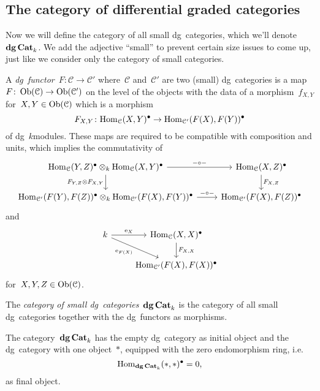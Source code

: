 \begin{refsection}
\section{The category of differential graded categories}
Now we will define the category of all small dg~categories, which we'll denote~$\mathbf{dg\,Cat}_k$. We add the adjective ``small'' to prevent certain size issues to come up, just like we consider only the category of small categories.
\begin{definition}
  A \emph{dg~functor}~$F\colon\mathcal{C}\to\mathcal{C}'$ where~$\mathcal{C}$ and~$\mathcal{C}'$ are two (small) dg~categories is a map~$F\colon\operatorname{Ob}(\mathcal{C})\to\operatorname{Ob}(\mathcal{C}')$ on the level of the objects with the data of a morphism~$f_{X,Y}$ for~$X,Y\in\operatorname{Ob}(\mathcal{C})$ which is a morphism
  \begin{equation}
    F_{X,Y}\colon\mathrm{Hom}_{\mathcal{C}}(X,Y)^\bullet\to\mathrm{Hom}_{\mathcal{C}'}(F(X),F(Y))^\bullet
  \end{equation}
  of dg~$k$\dash modules. These maps are required to be compatible with composition and units, which implies the commutativity of
  \begin{equation}
    \begin{tikzcd}
      \Hom_{\mathcal{C}}(Y,Z)^\bullet\otimes_k\Hom_{\mathcal{C}}(X,Y)^\bullet \arrow{r}{-\circ-} \arrow[swap]{d}{F_{Y,Z}\otimes F_{X,Y}} & \Hom_{\mathcal{C}}(X,Z)^\bullet \arrow{d}{F_{X,Z}} \\
      \Hom_{\mathcal{C}'}(F(Y),F(Z))^\bullet\otimes_k\Hom_{\mathcal{C}'}(F(X),F(Y))^\bullet \arrow{r}{-\circ-} & \Hom_{\mathcal{C}'}(F(X),F(Z))^\bullet
    \end{tikzcd}
  \end{equation}
  and
  \begin{equation}
    \begin{tikzcd}
      k \arrow{r}{\unit_X} \arrow{rd}[swap]{\unit_{F(X)}} & \Hom_{\mathcal{C}}(X,X)^\bullet \arrow{d}{F_{X,X}} \\
      & \Hom_{\mathcal{C}'}(F(X),F(X))^\bullet
    \end{tikzcd}
  \end{equation}
  for~$X,Y,Z\in\operatorname{Ob}(\mathcal{C})$.

  The \emph{category of small dg~categories}~$\mathbf{dg\,Cat}_k$ is the category of all small dg~categories together with the dg~functors as morphisms.
\end{definition}

\begin{remark}
  \label{remark:dgCat-initial-final}
  The category~$\mathbf{dg\,Cat}_k$ has the empty dg~category as initial object and the dg~category with one object~$*$, equipped with the zero endomorphism ring, i.e.
  \begin{equation}
    \mathrm{Hom}_{\mathbf{dg\,Cat}_k}(*,*)^\bullet=0,
  \end{equation}
  as final object.
\end{remark}


\end{refsection}
